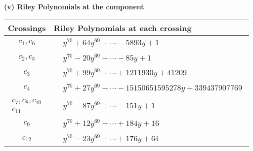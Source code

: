 \documentclass[1p]{elsarticle_modified}
\theoremstyle{definition}
\begin{document}
\newpage\renewcommand{\arraystretch}{1}
\flushleft \textbf{(v) Riley Polynomials at the component}\newline \\
\begin{tabular}{m{50pt}|m{274pt}}
Crossings & \hspace{64pt}Riley Polynomials at each crossing \\
\hline $$\begin{aligned}c_{1},c_{6}\end{aligned}$$&$\begin{aligned}
&y^{70}+64 y^{69}+\cdots-5893 y+1
\end{aligned}$\\
\hline $$\begin{aligned}c_{2},c_{5}\end{aligned}$$&$\begin{aligned}
&y^{70}-20 y^{69}+\cdots-85 y+1
\end{aligned}$\\
\hline $$\begin{aligned}c_{3}\end{aligned}$$&$\begin{aligned}
&y^{70}+99 y^{69}+\cdots+1211930 y+41209
\end{aligned}$\\
\hline $$\begin{aligned}c_{4}\end{aligned}$$&$\begin{aligned}
&y^{70}+27 y^{69}+\cdots-15150651595278 y+339437907769
\end{aligned}$\\
\hline $$\begin{aligned}c_{7},c_{8},c_{10}\\c_{11}\end{aligned}$$&$\begin{aligned}
&y^{70}-87 y^{69}+\cdots-151 y+1
\end{aligned}$\\
\hline $$\begin{aligned}c_{9}\end{aligned}$$&$\begin{aligned}
&y^{70}+12 y^{69}+\cdots+184 y+16
\end{aligned}$\\
\hline $$\begin{aligned}c_{12}\end{aligned}$$&$\begin{aligned}
&y^{70}-23 y^{69}+\cdots+176 y+64
\end{aligned}$\\
\hline
\end{tabular}\\~\\
\end{document}
